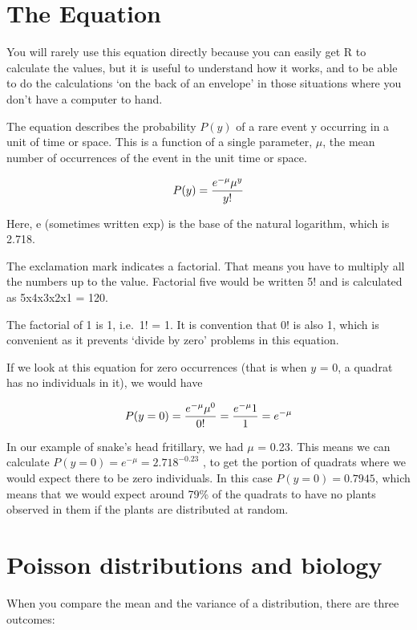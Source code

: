 \documentclass[
  letterpaper,
  DIV=11,
  numbers=noendperiod]{scrreprt}
\begin{document}
\section{The Equation}\label{the-equation}

You will rarely use this equation directly because you can easily get R
to calculate the values, but it is useful to understand how it works,
and to be able to do the calculations `on the back of an envelope' in
those situations where you don't have a computer to hand.

The equation describes the probability \(P(y)\) of a rare event y
occurring in a unit of time or space. This is a function of a single
parameter, \(\mu\), the mean number of occurrences of the event in the
unit time or space.

\[
P(y) = {e^{-\mu} \mu{^y} \over y!}
\]

Here, e (sometimes written exp) is the base of the natural logarithm,
which is 2.718.

The exclamation mark indicates a factorial. That means you have to
multiply all the numbers up to the value. Factorial five would be
written 5! and is calculated as 5x4x3x2x1 = 120.

The factorial of 1 is 1, i.e.~1! = 1. It is convention that 0! is also
1, which is convenient as it prevents `divide by zero' problems in this
equation.

If we look at this equation for zero occurrences (that is when \(y\) =
0, a quadrat has no individuals in it), we would have

\[
P(y = 0) = {e^{-\mu} \mu{^0} \over 0!} = {e^{-\mu} 1 \over 1} = e^{-\mu}
\]

In our example of snake's head fritillary, we had \(\mu\) = 0.23. This
means we can calculate \(P(y = 0) = e^{-\mu} = 2.718 ^{-0.23}\) , to get
the portion of quadrats where we would expect there to be zero
individuals. In this case \(P(y = 0) = 0.7945\), which means that we
would expect around 79\% of the quadrats to have no plants observed in
them if the plants are distributed at random.

\section{Poisson distributions and
biology}\label{poisson-distributions-and-biology}

When you compare the mean and the variance of a distribution, there are
three outcomes:
\end{document}
